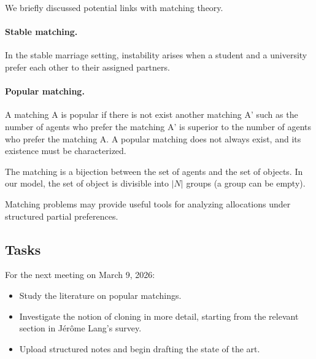 \documentclass{article}
\begin{document}
We briefly discussed potential links with matching theory.

\paragraph{Stable matching.}
In the stable marriage setting, instability arises when a student and a university prefer each other to their assigned partners.

\paragraph{Popular matching.} 
A matching A is popular if there is not exist another matching A' such as the number of agents who prefer the matching A' is superior to the number of agents who prefer the matching A.
A popular matching does not always exist, and its existence must be characterized.

The matching is a bijection between the set of agents and the set of objects. In our model, the set of object is divisible into $|N|$ groups (a group can be empty).

Matching problems may provide useful tools for analyzing allocations under structured partial preferences.

\subsection{Tasks}
For the next meeting on March 9, 2026:
\begin{itemize}
    \item Study the literature on popular matchings.
    \item Investigate the notion of cloning in more detail, starting from the relevant section in Jérôme Lang’s survey.
    \item Upload structured notes and begin drafting the state of the art.
\end{itemize}
\newpage
\end{document}

